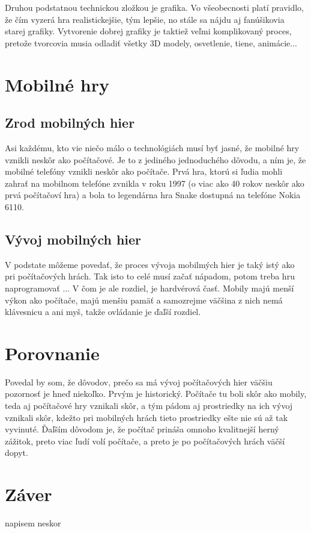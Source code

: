 \documentclass[10pt,twoside,slovak,a4paper]{article}
\begin{document}
Druhou podstatnou technickou zložkou je grafika. Vo všeobecnosti platí pravidlo, že čím vyzerá hra realistickejšie, tým lepšie, no stále sa nájdu aj fanúšikovia starej grafiky. Vytvorenie dobrej grafiky je taktiež veľmi komplikovaný proces, pretože tvorcovia musia odladiť všetky 3D modely, osvetlenie, tiene, animácie...~\cite{1} 

\section{Mobilné hry} \label{mobilne}

\subsection{Zrod mobilných hier}

Asi každému, kto vie niečo málo o technológiách musí byť jasné, že mobilné hry vznikli neskôr ako počítačové. Je to z jediného jednoduchého dôvodu, a ním je, že mobilné telefóny vznikli neskôr ako počítače. Prvá hra, ktorú si ľudia mohli zahrať na mobilnom telefóne zvnikla v roku 1997 (o viac ako 40 rokov neskôr ako prvá počítačoví hra) a bola to legendárna hra Snake dostupná na telefóne Nokia 6110.~\cite{2}

\subsection{Vývoj mobilných hier}
V podstate môžeme povedať, že proces vývoja mobilmých hier je taký istý ako pri počítačových hrách. Tak isto to celé musí začať nápadom, potom treba hru naprogramovať ... V čom je ale rozdiel, je hardvérová časť. Mobily majú menší výkon ako počítače, majú menšiu pamäť a samozrejme väčšina z nich nemá klávesnicu a ani myš, takže ovládanie je ďaľší rozdiel.

\section{Porovnanie} \label{porovnanie}

Povedal by som, že dôvodov, prečo sa má vývoj počítačových hier väčšiu pozornosť je hneď niekoľko. Prvým je historický. Počítače tu boli skôr ako mobily, teda aj počítačové hry vznikali skôr, a tým pádom aj prostriedky na ich vývoj vznikali skôr, kdežto pri mobilných hrách tieto prostriedky ešte nie sú až tak vyvinuté. Ďaľším dôvodom je, že počítač prináša omnoho kvalitnejší herný zážitok, preto viac ľudí volí počítače, a preto je po počítačových hrách väčší dopyt.

\section{Záver} \label{zaver}
napisem neskor


\end{document}
